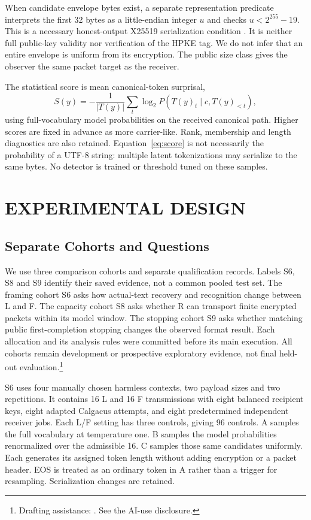 \documentclass[a4paper,twoside]{article}
\newcommand{\aidraft}{\footnote{Drafting assistance: \cite{openai2026codex}. See the AI-use disclosure.}}
\begin{document}
When candidate envelope bytes exist, a separate representation predicate interprets the first 32 bytes as a little-endian integer $u$ and checks $u<2^{255}-19$. This is a necessary honest-output X25519 serialization condition \cite{rfc7748}. It is neither full public-key validity nor verification of the HPKE tag. We do not infer that an entire envelope is uniform from its encryption. The public size class gives the observer the same packet target as the receiver.

The statistical score is mean canonical-token surprisal,
\begin{equation}
S(y)=-\frac{1}{|T(y)|}\sum_t\log_2 P(T(y)_t\mid c,T(y)_{<t}),
\label{eq:score}
\end{equation}
using full-vocabulary model probabilities on the received canonical path. Higher scores are fixed in advance as more carrier-like. Rank, membership and length diagnostics are also retained. Equation~\ref{eq:score} is not necessarily the probability of a UTF-8 string: multiple latent tokenizations may serialize to the same bytes. No detector is trained or threshold tuned on these samples.

\section{EXPERIMENTAL DESIGN}
\label{sec:design}
\subsection{Separate Cohorts and Questions}
\noindent We use three comparison cohorts and separate qualification records. Labels S6, S8 and S9 identify their saved evidence, not a common pooled test set. The framing cohort S6 asks how actual-text recovery and recognition change between L and F. The capacity cohort S8 asks whether R can transport finite encrypted packets within its model window. The stopping cohort S9 asks whether matching public first-completion stopping changes the observed format result. Each allocation and its analysis rules were committed before its main execution. All cohorts remain development or prospective exploratory evidence, not final held-out evaluation.\aidraft

S6 uses four manually chosen harmless contexts, two payload sizes and two repetitions. It contains 16 L and 16 F transmissions with eight balanced recipient keys, eight adapted Calgacus attempts, and eight predetermined independent receiver jobs. Each L/F setting has three controls, giving 96 controls. A samples the full vocabulary at temperature one. B samples the model probabilities renormalized over the admissible 16. C samples those same candidates uniformly. Each generates its assigned token length without adding encryption or a packet header. EOS is treated as an ordinary token in A rather than a trigger for resampling. Serialization changes are retained.
\end{document}
